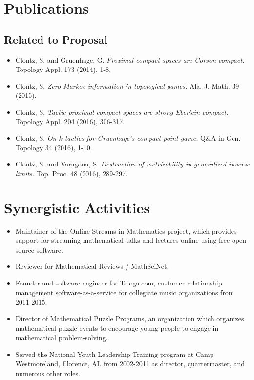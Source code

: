 \documentclass[11pt,letterpaper]{article}
\begin{document}

\section{Publications}

\subsection{Related to Proposal}

\begin{itemize}
  \item Clontz, S. and Gruenhage, G.
    \textit{Proximal compact spaces are Corson compact.}
    Topology Appl. 173 (2014), 1-8.
  \item Clontz, S.
    \textit{Zero-Markov information in topological games.}
    Ala. J. Math. 39 (2015).
  \item Clontz, S.
    \textit{Tactic-proximal compact spaces are strong Eberlein compact.}
    Topology Appl. 204 (2016), 306-317.
  \item Clontz, S.
    \textit{On \(k\)-tactics for Gruenhage's compact-point game.}
    Q\&A in Gen. Topology 34 (2016), 1-10.
  \item Clontz, S. and Varagona, S.
    \textit{Destruction of metrizability in generalized inverse limits.}
    Top. Proc. 48 (2016), 289-297.
\end{itemize}


\section{Synergistic Activities}

\begin{itemize}
  \item Maintainer of the Online Streams in Mathematics project, which
  provides support for streaming mathematical talks and lectures online
  using free open-source software.
  \item Reviewer for Mathematical Reviews / MathSciNet.
  \item Founder and software engineer for Teloga.com, customer relationship
        management software-as-a-service for collegiate music organizations
        from 2011-2015.
  \item Director of Mathematical Puzzle Programs, an organization which
        organizes mathematical puzzle events to encourage young people to
        engage in mathematical problem-solving.
  \item Served the National Youth Leadership Training program at Camp Westmoreland,
        Florence, AL from 2002-2011 as director, quartermaster, and
        numerous other roles.
\end{itemize}
\end{document}
